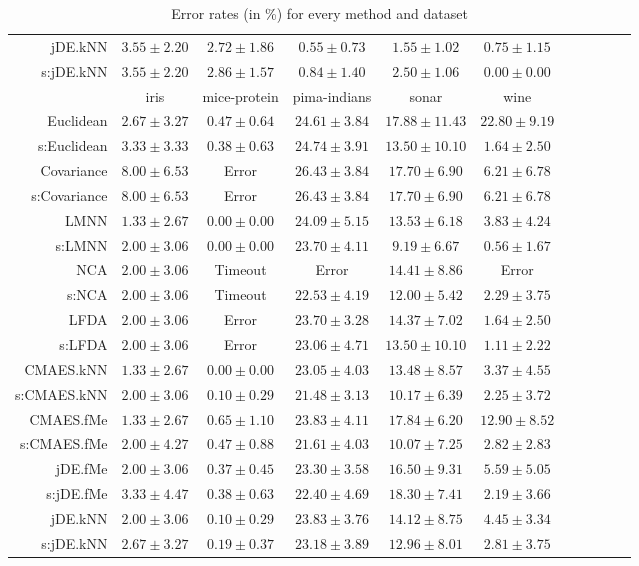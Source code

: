 \begin{table}[ht]
{\begin{tabular}{rcccccccccc}
jDE.kNN & $3.55\pm2.20$ & $2.72\pm1.86$ & $0.55\pm0.73$ & $1.55\pm1.02$ & $0.75\pm1.15$ \\
s:jDE.kNN & $3.55\pm2.20$ & $2.86\pm1.57$ & $0.84\pm1.40$ & $2.50\pm1.06$ & $\bm{0.00\pm0.00}$ \\
\midrule
& \multicolumn{1}{c}{iris} & \multicolumn{1}{c}{mice-protein} & \multicolumn{1}{c}{pima-indians} & \multicolumn{1}{c}{sonar} & \multicolumn{1}{c}{wine} \\ 
\midrule
Euclidean & $2.67\pm3.27$ & $0.47\pm0.64$ & $24.61\pm3.84$ & $17.88\pm11.43$ & $22.80\pm9.19$ \\
s:Euclidean & $3.33\pm3.33$ & $0.38\pm0.63$ & $24.74\pm3.91$ & $13.50\pm10.10$ & $1.64\pm2.50$ \\
Covariance & $8.00\pm6.53$ & Error  & $26.43\pm3.84$ & $17.70\pm6.90$ & $6.21\pm6.78$ \\
s:Covariance & $8.00\pm6.53$ & Error  & $26.43\pm3.84$ & $17.70\pm6.90$ & $6.21\pm6.78$ \\
LMNN & $\bm{1.33\pm2.67}$ & $\bm{0.00\pm0.00}$ & $24.09\pm5.15$ & $13.53\pm6.18$ & $3.83\pm4.24$ \\
s:LMNN & $2.00\pm3.06$ & $\bm{0.00\pm0.00}$ & $23.70\pm4.11$ & $\bm{9.19\pm6.67}$ & $\bm{0.56\pm1.67}$ \\
NCA & $2.00\pm3.06$ & Timeout  & Error  & $14.41\pm8.86$ & Error  \\
s:NCA & $2.00\pm3.06$ & Timeout  & $22.53\pm4.19$ & $12.00\pm5.42$ & $2.29\pm3.75$ \\
LFDA & $2.00\pm3.06$ & Error  & $23.70\pm3.28$ & $14.37\pm7.02$ & $1.64\pm2.50$ \\
s:LFDA & $2.00\pm3.06$ & Error  & $23.06\pm4.71$ & $13.50\pm10.10$ & $1.11\pm2.22$ \\
CMAES.kNN & $\bm{1.33\pm2.67}$ & $\bm{0.00\pm0.00}$ & $23.05\pm4.03$ & $13.48\pm8.57$ & $3.37\pm4.55$ \\
s:CMAES.kNN & $2.00\pm3.06$ & $0.10\pm0.29$ & $\bm{21.48\pm3.13}$ & $10.17\pm6.39$ & $2.25\pm3.72$ \\
CMAES.fMe & $\bm{1.33\pm2.67}$ & $0.65\pm1.10$ & $23.83\pm4.11$ & $17.84\pm6.20$ & $12.90\pm8.52$ \\
s:CMAES.fMe & $2.00\pm4.27$ & $0.47\pm0.88$ & $21.61\pm4.03$ & $10.07\pm7.25$ & $2.82\pm2.83$ \\
jDE.fMe & $2.00\pm3.06$ & $0.37\pm0.45$ & $23.30\pm3.58$ & $16.50\pm9.31$ & $5.59\pm5.05$ \\
s:jDE.fMe & $3.33\pm4.47$ & $0.38\pm0.63$ & $22.40\pm4.69$ & $18.30\pm7.41$ & $2.19\pm3.66$ \\
jDE.kNN & $2.00\pm3.06$ & $0.10\pm0.29$ & $23.83\pm3.76$ & $14.12\pm8.75$ & $4.45\pm3.34$ \\
s:jDE.kNN & $2.67\pm3.27$ & $0.19\pm0.37$ & $23.18\pm3.89$ & $12.96\pm8.01$ & $2.81\pm3.75$ \\


\bottomrule
\end{tabular}
}
\caption{Error rates (in \%) for every method and dataset} \label{tab:errors-small}
\end{table}

